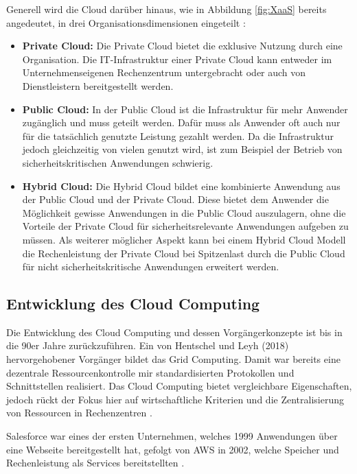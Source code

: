 Generell wird die Cloud darüber hinaus, wie in Abbildung \ref{fig:XaaS} bereits angedeutet, in drei Organisationsdimensionen eingeteilt \cite[Vgl. auch im Folgenden][S. 7ff]{Reinheimer2018}:
\begin{itemize}
\item \textbf{Private Cloud:} Die Private Cloud bietet die exklusive Nutzung durch eine Organisation. Die IT-Infrastruktur einer Private Cloud kann entweder im Unternehmenseigenen Rechenzentrum untergebracht oder auch von Dienstleistern bereitgestellt werden.
\item \textbf{Public Cloud:} In der Public Cloud ist die Infrastruktur für mehr Anwender zugänglich und muss geteilt werden. Dafür muss als Anwender oft auch nur für die tatsächlich genutzte Leistung gezahlt werden. Da die Infrastruktur jedoch gleichzeitig von vielen genutzt wird, ist zum Beispiel der Betrieb von sicherheitskritischen Anwendungen schwierig.
\item \textbf{Hybrid Cloud:} Die Hybrid Cloud bildet eine kombinierte Anwendung aus der Public Cloud und der Private Cloud. Diese bietet dem Anwender die Möglichkeit gewisse Anwendungen in die Public Cloud auszulagern, ohne die Vorteile der Private Cloud für sicherheitsrelevante Anwendungen aufgeben zu müssen. Als weiterer möglicher Aspekt kann bei einem Hybrid Cloud Modell die Rechenleistung der Private Cloud bei Spitzenlast durch die Public Cloud für nicht sicherheitskritische Anwendungen erweitert werden. 
\end{itemize} \pagebreak

\subsection{Entwicklung des Cloud Computing}
\label{sec:entwicklung}
Die Entwicklung des Cloud Computing und dessen Vorgängerkonzepte ist bis in die 90er Jahre zurückzuführen. Ein von Hentschel und Leyh (2018) hervorgehobener Vorgänger bildet das Grid Computing. Damit war bereits eine dezentrale Ressourcenkontrolle mir standardisierten Protokollen und Schnittstellen realisiert. Das Cloud Computing bietet vergleichbare Eigenschaften, jedoch rückt der Fokus hier auf wirtschaftliche Kriterien und die Zentralisierung von Ressourcen in Rechenzentren \cite[Vgl.][S. 5f]{Reinheimer2018}.

Salesforce war eines der ersten Unternehmen, welches 1999 Anwendungen über eine Webseite bereitgestellt hat, gefolgt von \ac{AWS} in 2002, welche Speicher und Rechenleistung als Services bereitstellten \cite[Vgl.][S. 17f]{Srivastava2018}.

